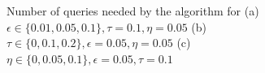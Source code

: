 \begin{figure}
    \centering
    \caption{Number of queries needed by the algorithm for (a) $\epsilon \in \{0.01, 0.05, 0.1\}, \tau=0.1, \eta=0.05$ (b) $\tau \in \{0, 0.1, 0.2\}, \epsilon=0.05, \eta=0.05$ (c) $\eta \in \{0, 0.05, 0.1\}, \epsilon=0.05, \tau=0.1$}
    \label{fig:results}
\end{figure}